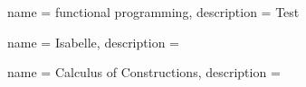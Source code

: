  
{name = functional programming,
description = {Test %
}}

{name = Isabelle,
description = {%
}}

{name = Calculus of Constructions,
description = {%
}}






